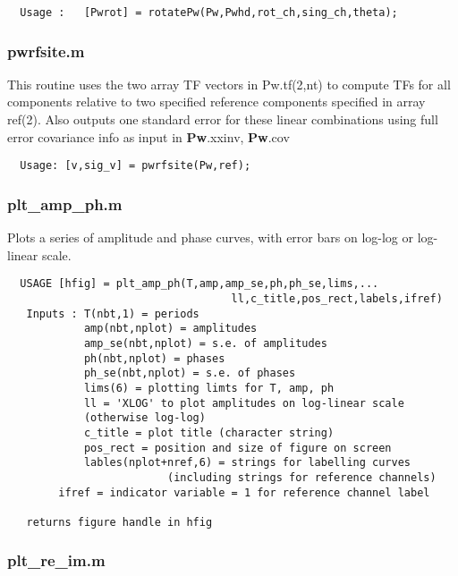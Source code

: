 \small
\begin{verbatim}
  Usage :   [Pwrot] = rotatePw(Pw,Pwhd,rot_ch,sing_ch,theta);
\end{verbatim}
\normalsize

\subsubsection{pwrfsite.m} 

This routine uses the two array TF vectors in Pw.tf(2,nt)
to compute TFs for all components relative to two specified reference
components specified in array ref(2).
Also outputs one standard error for these linear combinations
using full error covariance info as input in {\bf Pw}.xxinv, {\bf Pw}.cov

\small
\begin{verbatim}
  Usage: [v,sig_v] = pwrfsite(Pw,ref);
\end{verbatim}
\normalsize



\subsubsection{plt_amp_ph.m}

Plots a series of amplitude and phase curves, with error bars
on log-log or log-linear scale.

\small
\begin{verbatim}
  USAGE [hfig] = plt_amp_ph(T,amp,amp_se,ph,ph_se,lims,...
                                   ll,c_title,pos_rect,labels,ifref)
   Inputs : T(nbt,1) = periods
            amp(nbt,nplot) = amplitudes
            amp_se(nbt,nplot) = s.e. of amplitudes
            ph(nbt,nplot) = phases
            ph_se(nbt,nplot) = s.e. of phases
            lims(6) = plotting limts for T, amp, ph
            ll = 'XLOG' to plot amplitudes on log-linear scale
			(otherwise log-log)
            c_title = plot title (character string)
            pos_rect = position and size of figure on screen
            lables(nplot+nref,6) = strings for labelling curves
                         (including strings for reference channels)
 	    ifref = indicator variable = 1 for reference channel label

   returns figure handle in hfig
\end{verbatim}
\normalsize

\subsubsection{plt_re_im.m}

